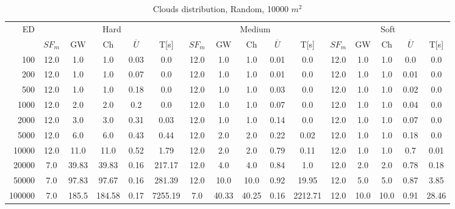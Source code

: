 \begin{table}[htb]
	\centering
	\footnotesize
	\begin{tabular}{|r|c|c|c|c|c|c|c|c|c|c|c|c|c|c|c|} 
		\hline
		\multirow{2}{*}{ED} & \multicolumn{5}{c|}{Hard} & \multicolumn{5}{c|}{Medium} &\multicolumn{5}{c|}{Soft} \\ 
		\cline{2-16} 
		&$SF_{m}$&GW & Ch & $\overline{U}$&T[s] &$SF_{m}$&GW & Ch & $\overline{U}$ &T[s] &$SF_{m}$&GW & Ch & $\overline{U}$  & T[s]  \\ 
		\hline 
		100 & 12.0 & 1.0 & 1.0 & 0.03 & 0.0 & 12.0 & 1.0 & 1.0 & 0.01 & 0.0 & 12.0 & 1.0 & 1.0 & 0.0 & 0.0\\ 
		200 & 12.0 & 1.0 & 1.0 & 0.07 & 0.0 & 12.0 & 1.0 & 1.0 & 0.01 & 0.0 & 12.0 & 1.0 & 1.0 & 0.01 & 0.0\\ 
		500 & 12.0 & 1.0 & 1.0 & 0.18 & 0.0 & 12.0 & 1.0 & 1.0 & 0.03 & 0.0 & 12.0 & 1.0 & 1.0 & 0.02 & 0.0\\ 
		1000 & 12.0 & 2.0 & 2.0 & 0.2 & 0.0 & 12.0 & 1.0 & 1.0 & 0.07 & 0.0 & 12.0 & 1.0 & 1.0 & 0.04 & 0.0\\ 
		2000 & 12.0 & 3.0 & 3.0 & 0.31 & 0.03 & 12.0 & 1.0 & 1.0 & 0.14 & 0.0 & 12.0 & 1.0 & 1.0 & 0.07 & 0.0\\ 
		5000 & 12.0 & 6.0 & 6.0 & 0.43 & 0.44 & 12.0 & 2.0 & 2.0 & 0.22 & 0.02 & 12.0 & 1.0 & 1.0 & 0.18 & 0.0\\ 
		10000 & 12.0 & 11.0 & 11.0 & 0.52 & 1.79 & 12.0 & 2.0 & 2.0 & 0.79 & 0.11 & 12.0 & 1.0 & 1.0 & 0.7 & 0.01\\ 
		20000 & 7.0 & 39.83 & 39.83 & 0.16 & 217.17 & 12.0 & 4.0 & 4.0 & 0.84 & 1.0 & 12.0 & 2.0 & 2.0 & 0.78 & 0.18\\ 
		50000 & 7.0 & 97.83 & 97.67 & 0.16 & 281.39 & 12.0 & 10.0 & 10.0 & 0.92 & 19.95 & 12.0 & 5.0 & 5.0 & 0.87 & 3.85\\ 
		100000 & 7.0 & 185.5 & 184.58 & 0.17 & 7255.19 & 7.0 & 40.33 & 40.25 & 0.16 & 2212.71 & 12.0 & 10.0 & 10.0 & 0.91 & 28.46\\ 
		\hline 
	\end{tabular} 
	\caption{Clouds distribution, Random, 10000 $m^2$} 
	\label{tab:UnRandom100} 
\end{table} 
